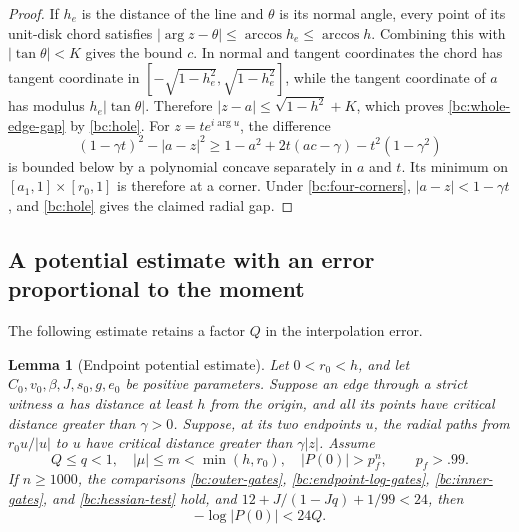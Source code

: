 \documentclass[11pt,reqno]{amsart}
\numberwithin{equation}{section}
\newtheorem{lemma}[theorem]{Lemma}
\theoremstyle{definition}
\theoremstyle{remark}
\begin{document}
\begin{proof}
If $h_e$ is the distance of the line and $\theta$ is its normal
angle, every point of its unit-disk chord satisfies
$|\arg z-\theta|\leq\arccos h_e\leq\arccos h$.
Combining this with $|\tan\theta|<K$ gives the bound $c$.
In normal and tangent coordinates the chord has tangent coordinate
in $[-\sqrt{1-h_e^2},\sqrt{1-h_e^2}]$, while the tangent
coordinate of $a$ has modulus $h_e|\tan\theta|$.  Therefore
$|z-a|\leq\sqrt{1-h^2}+K$, which proves
\eqref{bc:whole-edge-gap} by \eqref{bc:hole}.
For $z=t e^{i\arg u}$, the difference
\[
 (1-\gamma t)^2-|a-z|^2
 \geq1-a^2+2t(ac-\gamma)-t^2(1-\gamma^2)
\]
is bounded below by a polynomial concave separately in $a$ and $t$.
Its minimum on $[a_1,1]\times[r_0,1]$ is therefore at a corner.
Under \eqref{bc:four-corners}, $|a-z|<1-\gamma t$, and
\eqref{bc:hole} gives the claimed radial gap.
\end{proof}

\subsection{A potential estimate with an error proportional to the moment}

The following estimate retains a factor $Q$ in the interpolation error.

\begin{lemma}[Endpoint potential estimate]\label{bc:endpoint-potential}
Let $0<r_0<h$, and let $C_0,v_0,\beta,J,s_0,g,e_0$
be positive parameters.
Suppose an edge through a strict witness $a$ has distance at least $h$
from the origin, and all its points have critical distance greater than
$\gamma>0$.  Suppose, at its two endpoints $u$, the radial paths
from $r_0u/|u|$ to $u$ have critical distance greater than
$\gamma|z|$.  Assume
\[
 Q\leq q<1,\quad |\mu|\leq m<\min(h,r_0),\quad
 |P(0)|>p_f^n,\qquad p_f>.99.
\]
If $n\geq1000$, the comparisons
\eqref{bc:outer-gates}, \eqref{bc:endpoint-log-gates},
\eqref{bc:inner-gates}, and \eqref{bc:hessian-test} hold, and
$12+J/(1-Jq)+1/99<24$, then
\begin{equation}\label{bc:potential-24}
 -\log|P(0)|<24Q.
\end{equation}
\end{lemma}
\end{document}
